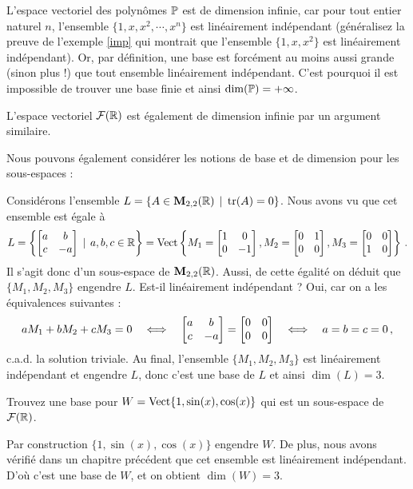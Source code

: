 \begin{myexample} L'espace vectoriel des polynômes $\mathbb{P}$ est de dimension infinie, car pour
tout entier naturel $n$, l'ensemble $\{1,x,x^2, \cdots, x^n\}$ est linéairement indépendant (généralisez la preuve de l'exemple \ref{imp} qui montrait que l'ensemble $\{1, x, x^2\}$ est linéairement indépendant). Or, par définition, une base est forcément au moins aussi grande (sinon plus !) que tout ensemble linéairement indépendant. C'est pourquoi il est impossible de trouver une base finie et ainsi $\dim(\mathbb{P})=+\infty$.  \end{myexample}

\begin{myexample} L'espace vectoriel $\mathcal{F}(\mathbb{R})$ est également de dimension infinie par un argument similaire.  \end{myexample}

Nous pouvons également considérer les notions de base et de dimension pour les sous-espaces :

\begin{myexample} Considérons l'ensemble $L = \{ A \in \mathbf{M}_{2,2}(\mathbb{R}) \, \mid \, \operatorname{ tr}(A) = 0\}$.  Nous avons vu que
cet ensemble est \'egale \`a
$$
L = \left\{ \left[ \begin{matrix} a & b \\ c& -a \end{matrix} \right] \, \mid \, a,b,c\in \mathbb{R} \right\} = \textrm{Vect}\left\{ M_1=\left[ \begin{matrix} 1 & 0 \\ 0 & -1 \end{matrix} \right], M_2=\left[ \begin{matrix} 0 & 1\\ 0 & 0 \end{matrix} \right], M_3=\left[ \begin{matrix} 0 & 0 \\ 1 & 0 \end{matrix} \right]\right\}\,.
$$
Il s'agit donc d'un sous-espace de $\mathbf{M}_{2,2}(\mathbb{R})$. Aussi, de cette \'egalit\'e on déduit que $\{M_1, M_2, M_3\}$ engendre $L$.  Est-il
linéairement indépendant ?  Oui, car on a les équivalences suivantes :
$$
aM_1 + bM_2 + cM_3 = 0 \quad\Longleftrightarrow\quad \left[ \begin{matrix} a & b \\ c& -a \end{matrix} \right] = \left[ \begin{matrix} 0 & 0\\0 & 0 \end{matrix} \right] \quad\Longleftrightarrow\quad a=b=c=0\,,
$$
c.a.d. la solution triviale.  Au final, l'ensemble $\{M_1, M_2,M_3\}$ est linéairement indépendant et
engendre $L$, donc c'est une base de $L$ et ainsi $\dim(L)=3$.  \end{myexample}

\begin{myprob} Trouvez une base pour $W = \textrm{Vect}\{1, \sin(x), \cos(x)\}$ qui est un sous-espace de $\mathcal{F}(\mathbb{R})$.

\begin{mysol} Par construction $\{ 1, \sin(x), \cos(x)\}$ engendre $W$.  De plus, nous avons vérifié dans un chapitre pr\'ec\'edent que cet ensemble est linéairement indépendant. D'o\`u c'est une base de $W$, et on obtient $\dim(W) = 3$. \end{mysol}\end{myprob}

